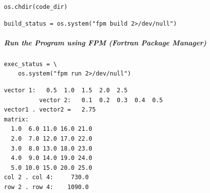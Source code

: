 \begin{verbatim}
os.chdir(code_dir)
\end{verbatim}

\begin{verbatim}
build_status = os.system("fpm build 2>/dev/null")
\end{verbatim}

\subparagraph{Run the Program using FPM (Fortran Package Manager)}

\begin{verbatim}
exec_status = \
    os.system("fpm run 2>/dev/null")
\end{verbatim}

\begin{verbatim}
vector 1:   0.5  1.0  1.5  2.0  2.5
          vector 2:   0.1  0.2  0.3  0.4  0.5
vector1 . vector2 =   2.75
matrix:
  1.0  6.0 11.0 16.0 21.0
  2.0  7.0 12.0 17.0 22.0
  3.0  8.0 13.0 18.0 23.0
  4.0  9.0 14.0 19.0 24.0
  5.0 10.0 15.0 20.0 25.0
col 2 . col 4:     730.0
row 2 . row 4:    1090.0
\end{verbatim}